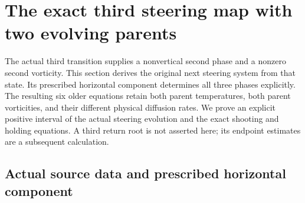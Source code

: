 \section{The exact third steering map with two evolving parents}
\label{tr:section}

The actual third transition supplies a nonvertical second phase and
a nonzero second vorticity. This section derives the original next
steering system from that state. Its prescribed horizontal component
determines all three phases explicitly. The resulting six older
equations retain both parent temperatures, both parent vorticities,
and their different physical diffusion rates. We prove an explicit
positive interval of the actual steering evolution and the exact
shooting and holding equations. A third return root is not asserted
here; its endpoint estimates are a subsequent calculation.

\subsection{Actual source data and prescribed horizontal component}

